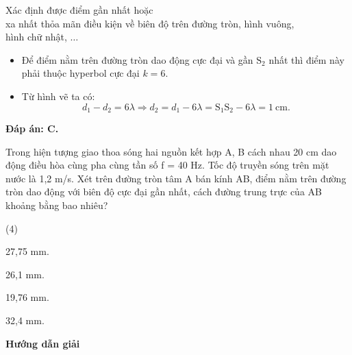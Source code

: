\begin{dang}{Xác định được điểm gần nhất hoặc\\ xa nhất thỏa mãn điều kiện về biên độ trên đường tròn, hình vuông,\\ hình chữ nhật, $\ldots$}
{\begin{itemize}
			\item Để điểm nằm trên đường tròn dao động cực đại và gần $\text{S}_2$ nhất thì điểm này phải thuộc hyperbol cực đại $k = 6$.
			
			\item Từ hình vẽ ta có: 
			\begin{equation*}
				d_1-d_2 = 6\lambda \Rightarrow  d_2 = d_1 - 6\lambda = \text{S}_1\text{S}_2 - 6\lambda = 1\ \text{cm}.
			\end{equation*}
			
		\end{itemize}
		
		\textbf{Đáp án: C.}
	}
	{
		Trong hiện tượng giao thoa sóng hai nguồn kết hợp A, B cách nhau 20 cm dao động điều hòa cùng pha cùng tần số f = 40 Hz. Tốc độ truyền sóng trên mặt nước là 1,2 m/s. Xét trên đường tròn tâm A bán kính AB, điểm nằm trên đường tròn dao động với biên độ cực đại gần nhất, cách đường trung trực của AB khoảng bằng bao nhiêu?
		
		\begin{mcq}(4)
			\item 27,75 mm.     
			\item 26,1 mm.     
			\item 19,76 mm.     
			\item 32,4 mm.
		\end{mcq}
	}
	{
		\begin{center}
			\textbf{Hướng dẫn giải}
			

\end{center}}
\end{dang}

